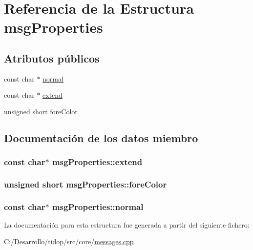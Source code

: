 \hypertarget{structmsg_properties}{}\section{Referencia de la Estructura msg\+Properties}
\label{structmsg_properties}
\subsection*{Atributos públicos}
\begin{DoxyCompactItemize}
\item 
const char $\ast$ \hyperlink{structmsg_properties_a49cb74021371b7e2d47b04a8010e76a8}{normal}
\item 
const char $\ast$ \hyperlink{structmsg_properties_a9eb055af2fdf96afc626c6e8eb62442c}{extend}
\item 
unsigned short \hyperlink{structmsg_properties_a1ae1f972fd65ebe736a209a0f3c807fe}{fore\+Color}
\end{DoxyCompactItemize}


\subsection{Documentación de los datos miembro}
\subsubsection[{\texorpdfstring{extend}{extend}}]{\setlength{\rightskip}{0pt plus 5cm}const char$\ast$ msg\+Properties\+::extend}\hypertarget{structmsg_properties_a9eb055af2fdf96afc626c6e8eb62442c}{}\label{structmsg_properties_a9eb055af2fdf96afc626c6e8eb62442c}
\subsubsection[{\texorpdfstring{fore\+Color}{foreColor}}]{\setlength{\rightskip}{0pt plus 5cm}unsigned short msg\+Properties\+::fore\+Color}\hypertarget{structmsg_properties_a1ae1f972fd65ebe736a209a0f3c807fe}{}\label{structmsg_properties_a1ae1f972fd65ebe736a209a0f3c807fe}
\subsubsection[{\texorpdfstring{normal}{normal}}]{\setlength{\rightskip}{0pt plus 5cm}const char$\ast$ msg\+Properties\+::normal}\hypertarget{structmsg_properties_a49cb74021371b7e2d47b04a8010e76a8}{}\label{structmsg_properties_a49cb74021371b7e2d47b04a8010e76a8}


La documentación para esta estructura fue generada a partir del siguiente fichero\+:\begin{DoxyCompactItemize}
\item 
C\+:/\+Desarrollo/tidop/src/core/\hyperlink{messages_8cpp}{messages.\+cpp}\end{DoxyCompactItemize}
